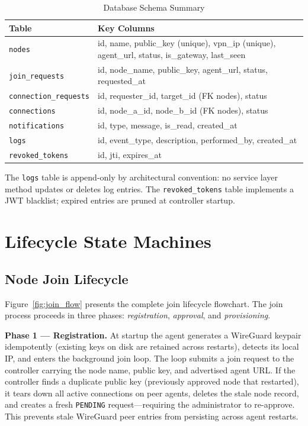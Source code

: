 \documentclass[conference]{IEEEtran}
\begin{document}
\begin{table}[!t]
\caption{Database Schema Summary}
\label{tab:schema}
\centering
\small
\setlength{\tabcolsep}{4pt}
\begin{tabularx}{\columnwidth}{@{}lX@{}}
\toprule
\textbf{Table} & \textbf{Key Columns} \\
\midrule
\texttt{nodes} & id, name, public\_key (unique), vpn\_ip (unique), agent\_url, status, is\_gateway, last\_seen \\
\texttt{join\_requests} & id, node\_name, public\_key, agent\_url, status, requested\_at \\
\texttt{connection\_requests} & id, requester\_id, target\_id (FK nodes), status \\
\texttt{connections} & id, node\_a\_id, node\_b\_id (FK nodes), status \\
\texttt{notifications} & id, type, message, is\_read, created\_at \\
\texttt{logs} & id, event\_type, description, performed\_by, created\_at \\
\texttt{revoked\_tokens} & id, jti, expires\_at \\
\bottomrule
\end{tabularx}
\end{table}

The \texttt{logs} table is append-only by architectural convention: no service
layer method updates or deletes log entries. The \texttt{revoked\_tokens} table
implements a JWT blacklist; expired entries are pruned at controller startup.


\FloatBarrier
\section{Lifecycle State Machines}
\label{sec:lifecycle}

\subsection{Node Join Lifecycle}

Figure~\ref{fig:join_flow} presents the complete join lifecycle flowchart.  The
join process proceeds in three phases: \emph{registration}, \emph{approval}, and
\emph{provisioning}.

\textbf{Phase 1 — Registration.} At startup the agent generates a WireGuard
keypair idempotently (existing keys on disk are retained across restarts), detects
its local IP, and enters the background join loop. The loop submits a join request
to the controller carrying the node name, public key, and advertised agent URL.
If the controller finds a duplicate public key (previously approved node that
restarted), it tears down all active connections on peer agents, deletes the stale
node record, and creates a fresh \texttt{PENDING} request---requiring the
administrator to re-approve. This prevents stale WireGuard peer entries from
persisting across agent restarts.
\end{document}
